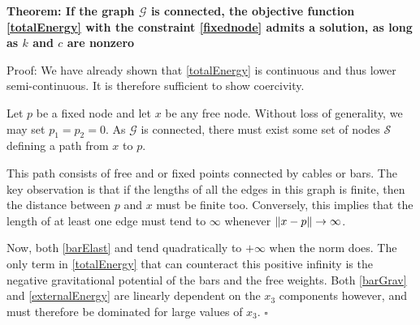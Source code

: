\textbf{Theorem: If the graph $\mathcal{G}$ is connected, the objective function \eqref{totalEnergy} with the constraint \eqref{fixednode} admits a solution, as long as $k$ and $c$ are nonzero}

Proof:
We have already shown that \eqref{totalEnergy} is continuous and thus lower semi-continuous. It is therefore sufficient to show coercivity.

Let $p$ be a fixed node and let $x$ be any free node. Without loss of generality, we may set $p_1 = p_2 = 0$. As $\mathcal{G}$ is connected, there must exist some set of nodes $\mathcal{S}$ defining a path from $x$ to $p$.

This path consists of free and or fixed points connected by cables or bars. The key observation is that if the lengths of all the edges in this graph is finite, then the distance between $p$ and $x$ must be finite too. Conversely, this implies that the length of at least one edge must tend to $\infty$ whenever $\lVert x-p \rVert \rightarrow \infty$.

Now, both \eqref{barElast} and  tend quadratically to $+\infty$ when the norm does. The only term in \eqref{totalEnergy} that can counteract this positive infinity is the negative gravitational potential of the bars and the free weights. Both \eqref{barGrav} and \eqref{externalEnergy} are linearly dependent on the $x_3$ components however, and must therefore be dominated for large values of $x_3$. \hfill $\square$




